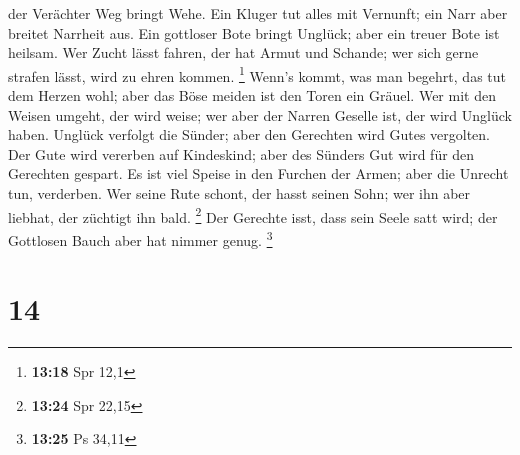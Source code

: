 der Verächter Weg bringt Wehe.  Ein Kluger tut alles mit
Vernunft; ein Narr aber breitet Narrheit aus.  Ein
gottloser Bote bringt Unglück; aber ein treuer Bote ist heilsam.
 Wer Zucht lässt fahren, der hat Armut und Schande; wer
sich gerne strafen lässt, wird zu ehren kommen. \footnote{\textbf{13:18}
  Spr 12,1}  Wenn's kommt, was man begehrt, das tut dem
Herzen wohl; aber das Böse meiden ist den Toren ein Gräuel.
 Wer mit den Weisen umgeht, der wird weise; wer aber der
Narren Geselle ist, der wird Unglück haben.  Unglück
verfolgt die Sünder; aber den Gerechten wird Gutes vergolten.
 Der Gute wird vererben auf Kindeskind; aber des Sünders
Gut wird für den Gerechten gespart.  Es ist viel Speise in
den Furchen der Armen; aber die Unrecht tun, verderben. 
Wer seine Rute schont, der hasst seinen Sohn; wer ihn aber liebhat, der
züchtigt ihn bald. \footnote{\textbf{13:24} Spr 22,15}  Der
Gerechte isst, dass sein Seele satt wird; der Gottlosen Bauch aber hat
nimmer genug. \footnote{\textbf{13:25} Ps 34,11}

\hypertarget{section-5}{%
\section{14}\label{section-5}}


